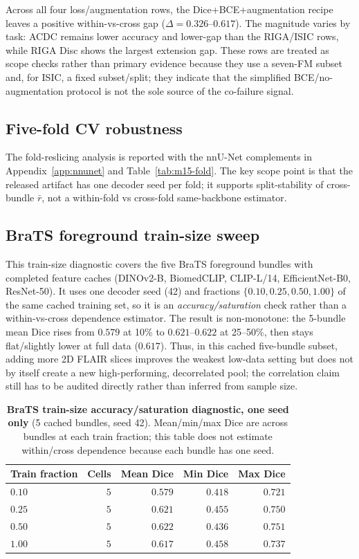 Across all four loss/augmentation rows, the Dice+BCE+augmentation recipe leaves a positive within-vs-cross gap ($\Delta=0.326$--$0.617$). The magnitude varies by task: ACDC remains lower accuracy and lower-gap than the RIGA/ISIC rows, while RIGA Disc shows the largest extension gap. These rows are treated as scope checks rather than primary evidence because they use a seven-FM subset and, for ISIC, a fixed subset/split; they indicate that the simplified BCE/no-augmentation protocol is not the sole source of the co-failure signal.

\subsection{Five-fold CV robustness}
\label{app:m15}

The fold-reslicing analysis is reported with the nnU-Net complements in
Appendix~\ref{app:nnunet} and Table~\ref{tab:m15-fold}. The key scope point is
that the released artifact has one decoder seed per fold; it supports split-stability of
cross-bundle $\bar r$, not a within-fold vs cross-fold same-backbone estimator.

\subsection{BraTS foreground train-size sweep}
\label{app:m19}

This train-size diagnostic covers the five BraTS foreground bundles with completed feature caches (DINOv2-B, BiomedCLIP, CLIP-L/14, EfficientNet-B0, ResNet-50). It uses one decoder seed (42) and fractions $\{0.10,0.25,0.50,1.00\}$ of the same cached training set, so it is an \emph{accuracy/saturation} check rather than a within-vs-cross dependence estimator. The result is non-monotone: the 5-bundle mean Dice rises from $0.579$ at 10\% to $0.621$--$0.622$ at 25--50\%, then stays flat/slightly lower at full data ($0.617$). Thus, in this cached five-bundle subset, adding more 2D FLAIR slices improves the weakest low-data setting but does not by itself create a new high-performing, decorrelated pool; the correlation claim still has to be audited directly rather than inferred from sample size.

\begin{table}[!htbp]
  \caption{\textbf{BraTS train-size accuracy/saturation diagnostic, one seed only} (5 cached bundles, seed 42). Mean/min/max Dice are across bundles at each train fraction; this table does not estimate within/cross dependence because each bundle has one seed.}
  \label{tab:m19}
  \centering\small
  \begin{tabular}{lrrrr}
    \toprule
    Train fraction & Cells & Mean Dice & Min Dice & Max Dice \\
    \midrule
    $0.10$ & $5$ & $0.579$ & $0.418$ & $0.721$ \\
    $0.25$ & $5$ & $0.621$ & $0.455$ & $0.750$ \\
    $0.50$ & $5$ & $0.622$ & $0.436$ & $0.751$ \\
    $1.00$ & $5$ & $0.617$ & $0.458$ & $0.737$ \\
    \bottomrule
  \end{tabular}
\end{table}

